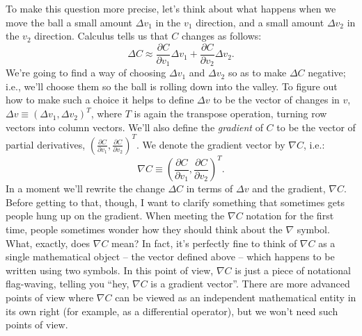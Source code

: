 \documentclass[a4paper,twoside,10pt]{book}
\begin{document}
To make this question more precise, let's think about what happens when we move the ball a small amount $\Delta v_1$ in the $v_1$ direction, and a small amount $\Delta v_2$ in the $v_2$ direction. Calculus tells us that $C$ changes as follows:
\begin{equation}
	\Delta C \approx \frac{\partial C}{\partial v_1} \Delta v_1 + \frac{\partial C}{\partial v_2} \Delta v_2.
	\label{eq:7}
\end{equation}
We're going to find a way of choosing $\Delta v_1$ and $\Delta v_2$ so as to make $\Delta C$ negative; i.e., we'll choose them so the ball is rolling down into the valley. To figure out how to make such a choice it helps to define $\Delta v$ to be the vector of changes in $v$, $\Delta v \equiv (\Delta v_1, \Delta v_2)^T$, where $T$ is again the transpose operation, turning row vectors into column vectors. We'll also define the \textit{gradient} of $C$ to be the vector of partial derivatives, $\left(\frac{\partial
	C}{\partial v_1}, \frac{\partial C}{\partial v_2}\right)^T$. We denote the gradient vector by $\nabla C$, i.e.:
\begin{equation}
\nabla C \equiv \left( \frac{\partial C}{\partial v_1}, \frac{\partial C}{\partial v_2} \right)^T.
\label{eq:8}
\end{equation}
In a moment we'll rewrite the change $\Delta C$ in terms of $\Delta{}v$ and the gradient, $\nabla C$. Before getting to that, though, I want to clarify something that sometimes gets people hung up on the gradient. When meeting the $\nabla C$ notation for the first time, people sometimes wonder how they should think about the $\nabla$ symbol. What, exactly, does $\nabla C$ mean? In fact, it's perfectly fine to think of $\nabla C$ as a single mathematical object -- the vector defined above -- which happens to be written using two symbols. In this point of view, $\nabla C$ is just a piece of notational flag-waving, telling you ``hey, $\nabla C$ is a gradient vector''. There are more advanced points of view where $\nabla C$ can be viewed as an independent mathematical entity in its own right (for example, as a differential operator), but we won't need such points of view.
\end{document}
